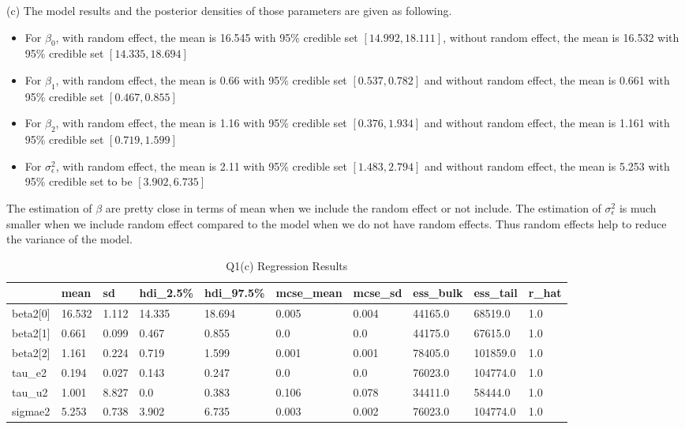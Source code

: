 \documentclass{homeworg}
\begin{document}
(c) The model results and the posterior densities of those parameters are given as following. 
\begin{itemize}
\item For $\beta_0$, with random effect, the mean is 16.545 with 95\% credible set $[14.992,18.111]$, without random effect, the mean is 16.532 with 95\% credible set $[14.335,18.694]$
\item For $\beta_1$, with random effect, the mean is 0.66 with 95\% credible set $[0.537,0.782]$ and without random effect, the mean is 0.661 with 95\% credible set $[0.467,0.855]$
\item For $\beta_2$, with random effect, the mean is 1.16 with 95\% credible set $[0.376,1.934]$ and without random effect, the mean is 1.161 with 95\% credible set 
$[0.719,1.599]$
\item For $\sigma_\epsilon^2$, with random effect, the mean is 2.11 with 95\% credible set $[1.483,2.794]$ and without random effect, the mean is 5.253 with 95\% credible set to be $[3.902,6.735]$
\end{itemize}
The estimation of $\beta$ are pretty close in terms of mean when we include the random effect or not include. The estimation of $\sigma_\epsilon^2$ is much smaller when we include random effect compared to the model when we do not have random effects. Thus random effects help to reduce the variance of the model.

\begin{table}[H]
		\caption{Q1(c) Regression Results}
	\begin{tabular}{llllllllll}
		\hline \hline
		& mean   & sd    & hdi\_2.5\% & hdi\_97.5\% & mcse\_mean & mcse\_sd & ess\_bulk & ess\_tail & r\_hat \\ \hline
		beta2{[}0{]} & 16.532 & 1.112 & 14.335     & 18.694      & 0.005      & 0.004    & 44165.0   & 68519.0   & 1.0    \\
		beta2{[}1{]} & 0.661  & 0.099 & 0.467      & 0.855       & 0.0        & 0.0      & 44175.0   & 67615.0   & 1.0    \\
		beta2{[}2{]} & 1.161  & 0.224 & 0.719      & 1.599       & 0.001      & 0.001    & 78405.0   & 101859.0  & 1.0    \\
		tau\_e2      & 0.194  & 0.027 & 0.143      & 0.247       & 0.0        & 0.0      & 76023.0   & 104774.0  & 1.0    \\
		tau\_u2      & 1.001  & 8.827 & 0.0        & 0.383       & 0.106      & 0.078    & 34411.0   & 58444.0   & 1.0   \\
		sigmae2 & 5.253 & 0.738 & 3.902 & 6.735 & 0.003 & 0.002 & 76023.0 & 104774.0 &1.0\\
		 \hline\hline
	\end{tabular}
\end{table}
\end{document}
